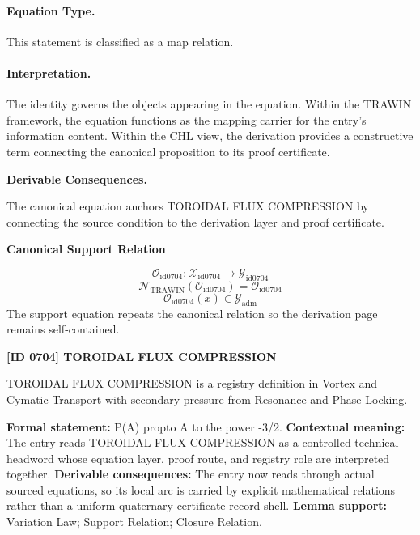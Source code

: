 \paragraph{Equation Type.}
This statement is classified as a map relation.

\paragraph{Interpretation.}
The identity governs the objects appearing in the equation. Within the TRAWIN framework, the equation functions as the mapping carrier for the entry’s information content. Within the CHL view, the derivation provides a constructive term connecting the canonical proposition to its proof certificate.

\par\vspace{0.35em}
\noindent\textbf{Derivable Consequences.}\quad
\begingroup
\footnotesize
\raggedright
The canonical equation anchors TOROIDAL FLUX COMPRESSION by connecting the source condition to the derivation layer and proof certificate.
\par\endgroup

\noindent\textbf{Canonical Support Relation}\par
\[
\mathcal{O}_{\mathrm{id0704}}:\mathcal{X}_{\mathrm{id0704}}\longrightarrow\mathcal{Y}_{\mathrm{id0704}}
\]
\[
\mathcal{N}_{\mathrm{TRAWIN}}(\mathcal{O}_{\mathrm{id0704}})=\mathcal{O}_{\mathrm{id0704}}
\]
\[
\mathcal{O}_{\mathrm{id0704}}(x)\in\mathcal{Y}_{\mathrm{adm}}
\]
\noindent The support equation repeats the canonical relation so the derivation page remains self-contained.\par

\clearpage
\noindent\textbf{[ID 0704] TOROIDAL FLUX COMPRESSION}\par
\vspace{0.35em}
\begingroup\small
{}
TOROIDAL FLUX COMPRESSION is a registry definition in Vortex and Cymatic Transport with secondary pressure from Resonance and Phase Locking.

\begingroup\footnotesize\setlength{\emergencystretch}{3em}\sloppy
\textbf{Formal statement:} P(A) propto A to the power -3/2. \textbf{Contextual meaning:} The entry reads TOROIDAL FLUX COMPRESSION as a controlled technical headword whose equation layer, proof route, and registry role are interpreted together. \textbf{Derivable consequences:} The entry now reads through actual sourced equations, so its local arc is carried by explicit mathematical relations rather than a uniform quaternary certificate record shell. \textbf{Lemma support:} Variation Law; Support Relation; Closure Relation.\par
\endgroup

